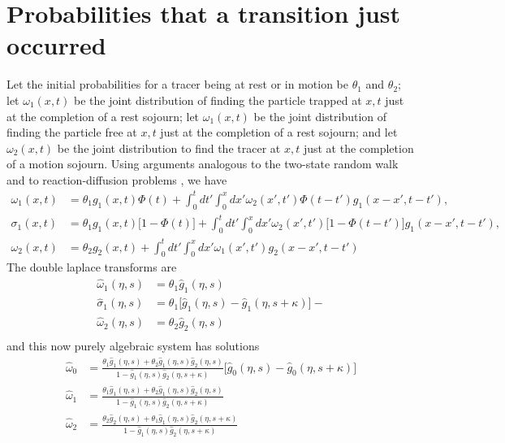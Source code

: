 \documentclass[11pt]{article}
\begin{document}
\section{Probabilities that a transition just occurred}
Let the initial probabilities for a tracer being at rest or in motion be $\theta_1$ and $\theta_2$; let $\omega_1(x,t)$ be the joint distribution of finding the particle trapped at $x,t$ just at the completion of a rest sojourn; let $\omega_1(x,t)$ be the joint distribution of finding the particle free at $x,t$ just at the completion of a rest sojourn; and let $\omega_2(x,t)$ be the joint distribution to find the tracer at $x,t$ just at the completion of a motion sojourn.
Using arguments analogous to the two-state random walk \citep[e.g.][]{Weiss1976,Weiss1994} and to reaction-diffusion problems \citep[e.g.][]{Schmidt2007}, we have 
\begin{align}
\omega_1(x,t) &= \theta_1 g_1(x,t)\Phi(t) + \int_0^t dt' \int_0^x dx' \omega_2(x',t')\Phi(t-t')g_1(x-x',t-t'), \\
\sigma_1(x,t) &= \theta_1 g_1(x,t)\big[1-\Phi(t)\big] + \int_0^t dt' \int_0^x dx' \omega_2(x',t')\big[1-\Phi(t-t')\big]g_1(x-x',t-t'), \\
\omega_2(x,t) &= \theta_2g_2(x,t) + \int_0^t dt' \int_0^x dx' \omega_1(x',t')g_2(x-x',t-t')
\end{align}
The double laplace transforms are 
\begin{align}
\hat{\omega}_1(\eta,s) &= \theta_1 \hat{g}_1(\eta,s) \\
\hat{\sigma}_1(\eta,s) &= \theta_1\big[\hat{g}_1(\eta,s) - \hat{g}_1(\eta,s+\kappa)\big] -\\
\hat{\omega}_2(\eta,s) &= \theta_2 \hat{g}_2(\eta,s) \\
\end{align}
and this now purely algebraic system has solutions
\begin{align}
\hat{\omega}_0 &=\frac{\theta_1\hat{g}_1(\eta,s) + \theta_2\hat{g}_1(\eta,s) \hat{g}_2(\eta,s)}{1- \hat{g}_1(\eta,s)\hat{g}_2(\eta,s+\kappa)}\big[\hat{g}_0(\eta,s)-\hat{g}_0(\eta,s+\kappa)\big]  \\
\hat{\omega}_1 &= \frac{\theta_1\hat{g}_1(\eta,s) + \theta_2\hat{g}_1(\eta,s) \hat{g}_2(\eta,s)}{1- \hat{g}_1(\eta,s)\hat{g}_2(\eta,s+\kappa)} \\
\hat{\omega}_2 &= \frac{\theta_2 \hat{g}_2(\eta,s)  + \theta_1 \hat{g}_1(\eta,s)\hat{g}_2(\eta,s+\kappa)}{1- \hat{g}_1(\eta,s)\hat{g}_2(\eta,s+\kappa)}
\end{align}
\end{document}
